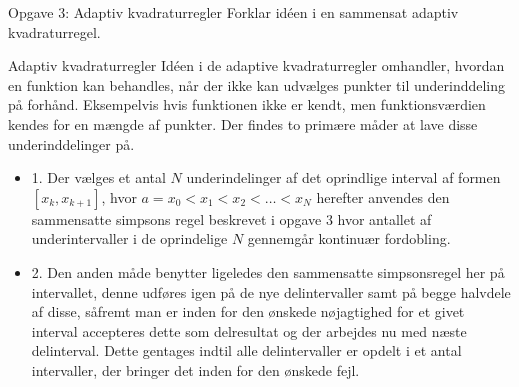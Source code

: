 \begin{frame}{Opgave 3: Adaptiv kvadraturregler}
    Forklar idéen i en sammensat adaptiv kvadraturregel.
\end{frame}

\begin{frame}{Adaptiv kvadraturregler}
    Idéen i de adaptive kvadraturregler omhandler, hvordan en funktion kan behandles, når der ikke kan udvælges punkter til underinddeling på forhånd. Eksempelvis hvis funktionen ikke er kendt, men funktionsværdien kendes for en mængde af punkter. Der findes to primære måder at lave disse underinddelinger på. 
    \begin{itemize}
        \item 1. Der vælges et antal $N$ underindelinger af det oprindlige interval af formen $\left [  x_k, x_{k+1} \right ]$, hvor $a=x_0<x_1<x_2<\ldots<x_N$ herefter anvendes den sammensatte simpsons regel beskrevet i opgave 3 hvor antallet af underintervaller i de oprindelige $N$ gennemgår kontinuær fordobling.
        \item 2. Den anden måde benytter ligeledes den sammensatte simpsonsregel her på intervallet, denne udføres igen på de nye delintervaller samt på begge halvdele af disse, såfremt man er inden for den ønskede nøjagtighed for et givet interval accepteres dette som delresultat og der arbejdes nu med næste delinterval. Dette gentages indtil alle delintervaller er opdelt i et antal intervaller, der bringer det inden for den ønskede fejl.
    \end{itemize}
\end{frame}